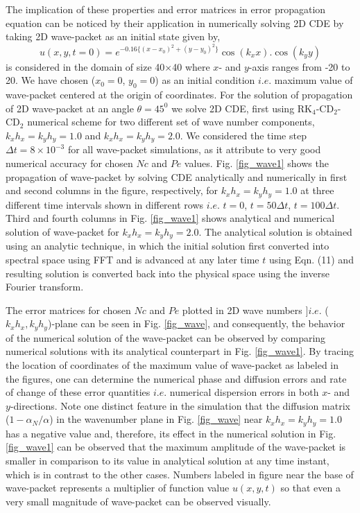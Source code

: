 \documentclass[showpacs,preprintnumbers,amsmath,amssymb]{revtex4-1} %
\begin{document}
The implication of these properties and error matrices in error propagation equation can be noticed by their application in numerically solving 2D CDE by taking 2D wave-packet as an initial state given by,
\begin{equation}
u(x,y,t=0)=e^{-0.16\{(x-x_0)^2+(y-y_0)^2\}} \cos(k_xx).\cos(k_yy) \nonumber
\end{equation}
is considered in the domain of size 40$\times$40 where $x$- and $y$-axis ranges from -20 to 20. We have chosen ($x_0=0$, $y_0=0$) as an initial condition $\textit{i.e.}$ maximum value of wave-packet centered at the origin of coordinates. For the solution of propagation of 2D wave-packet at an angle $\theta=45^0$ we solve 2D CDE, first using RK$_4$-CD$_2$-CD$_2$ numerical scheme for two different set of wave number components, $k_xh_x=k_yh_y=1.0$ and $k_xh_x=k_yh_y=2.0$. We considered the time step $\Delta t=8 \times 10^{-3}$ for all wave-packet simulations, as it attribute to very good numerical accuracy for chosen $Nc$ and $Pe$ values. Fig. \ref{fig_wave1} shows the propagation of wave-packet by solving CDE analytically and numerically in first and second columns in the figure, respectively, for $k_xh_x=k_yh_y=1.0$ at three different time intervals shown in different rows $\textit{i.e.}$ $t=0$, $t=50 \Delta t$, $t=100 \Delta t$. Third and fourth columns in Fig. \ref{fig_wave1} shows analytical and numerical solution of wave-packet for $k_xh_x=k_yh_y=2.0$. The analytical solution is obtained using an analytic technique, in which the initial solution first converted into spectral space using FFT and is advanced at any later time $t$ using Eqn. (11) and resulting solution is converted back into the physical space using the inverse Fourier transform.

The error matrices for chosen $Nc$ and $Pe$ plotted in 2D wave numbers $]\textit{i.e.}$ ($k_xh_x,k_yh_y$)-plane can be seen in Fig. \ref{fig_wave}, and consequently, the behavior of the numerical solution of the wave-packet can be observed by comparing numerical solutions with its analytical counterpart in Fig. \ref{fig_wave1}. By tracing the location of coordinates of the maximum value of wave-packet as labeled in the figures, one can determine the numerical phase and diffusion errors and rate of change of these error quantities $\textit{i.e.}$ numerical dispersion errors in both $x$- and $y$-directions. Note one distinct feature in the simulation that the diffusion matrix ($1-\alpha_N/\alpha$) in the wavenumber plane in Fig. \ref{fig_wave} near $k_xh_x=k_yh_y=1.0$ has a negative value and, therefore, its effect in the numerical solution in Fig. \ref{fig_wave1} can be observed that the maximum amplitude of the wave-packet is smaller in comparison to its value in analytical solution at any time instant, which is in contrast to the other cases. Numbers labeled in figure near the base of wave-packet represents a multiplier of function value $u(x,y,t)$ so that even a very small magnitude of wave-packet can be observed visually.
\end{document}
